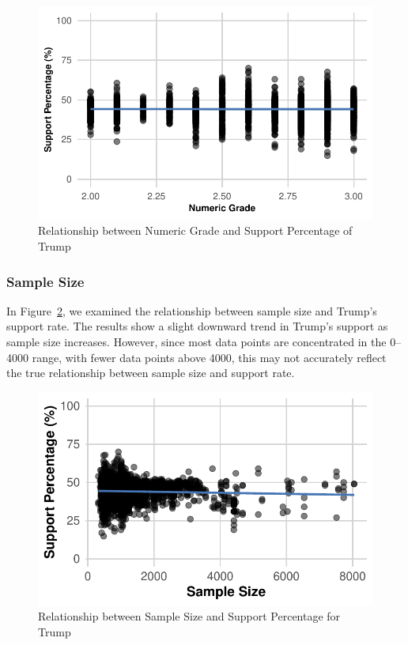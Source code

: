 \documentclass[
  letterpaper,
  DIV=11,
  numbers=noendperiod]{scrartcl}
\begin{document}
\begin{figure}

{\centering \includegraphics{Insights-and-Predictions-for-the-U.S.-Election_files/figure-pdf/fig-method-1.pdf}

}

\caption{\label{fig-method}Relationship between Numeric Grade and
Support Percentage of Trump}

\end{figure}

\hypertarget{sample-size}{%
\subsubsection{Sample Size}\label{sample-size}}

In Figure~\ref{fig-sample-size}, we examined the relationship between
sample size and Trump's support rate. The results show a slight downward
trend in Trump's support as sample size increases. However, since most
data points are concentrated in the 0--4000 range, with fewer data
points above 4000, this may not accurately reflect the true relationship
between sample size and support rate.

\begin{figure}

{\centering \includegraphics{Insights-and-Predictions-for-the-U.S.-Election_files/figure-pdf/fig-sample-size-1.pdf}

}

\caption{\label{fig-sample-size}Relationship between Sample Size and
Support Percentage for Trump}

\end{figure}
\end{document}
